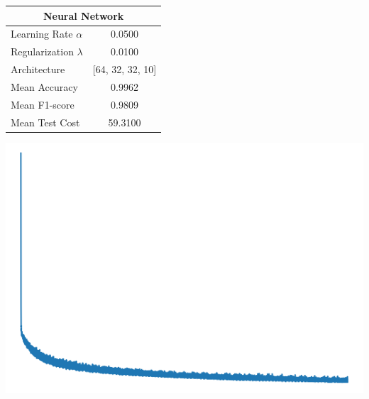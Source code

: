 \documentclass{article}
\begin{document}
\begin{minipage}{0.49\textwidth}
    \centering

    \begin{tabular}{lc}
        \toprule
        \multicolumn{2}{c}{Neural Network} \\
        \midrule
        Learning Rate $\alpha$ & 0.0500 \\
        Regularization $\lambda$ & 0.0100 \\
        Architecture & [64, 32, 32, 10] \\
        Mean Accuracy & 0.9962 \\
        Mean F1-score & 0.9809 \\
        Mean Test Cost & 59.3100 \\
        \bottomrule
    \end{tabular}
\end{minipage}
\hfill
\begin{minipage}{0.49\textwidth}
    \centering
    
    \includegraphics*[width=1\textwidth]{./src/figures/Digits_train_cost.png}
    \vfill
\end{minipage}
\end{document}
